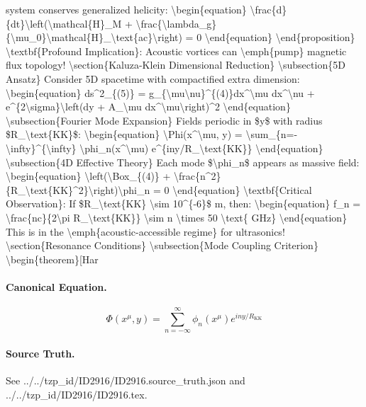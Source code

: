 system conserves generalized helicity: \textbackslash{}begin\{equation\} \textbackslash{}frac\{d\}\{dt\}\textbackslash{}left(\textbackslash{}mathcal\{H\}\_M + \textbackslash{}frac\{\textbackslash{}lambda\_g\}\{\textbackslash{}mu\_0\}\textbackslash{}mathcal\{H\}\_\textbackslash{}text\{ac\}\textbackslash{}right) = 0 \textbackslash{}end\{equation\} \textbackslash{}end\{proposition\} \textbackslash{}textbf\{Profound Implication\}: Acoustic vortices can \textbackslash{}emph\{pump\} magnetic flux topology! \textbackslash{}section\{Kaluza-Klein Dimensional Reduction\} \textbackslash{}subsection\{5D Ansatz\} Consider 5D spacetime with compactified extra dimension: \textbackslash{}begin\{equation\} ds\textasciicircum{}2\_\{(5)\} = g\_\{\textbackslash{}mu\textbackslash{}nu\}\textasciicircum{}\{(4)\}dx\textasciicircum{}\textbackslash{}mu dx\textasciicircum{}\textbackslash{}nu + e\textasciicircum{}\{2\textbackslash{}sigma\}\textbackslash{}left(dy + A\_\textbackslash{}mu dx\textasciicircum{}\textbackslash{}mu\textbackslash{}right)\textasciicircum{}2 \textbackslash{}end\{equation\} \textbackslash{}subsection\{Fourier Mode Expansion\} Fields periodic in \$y\$ with radius \$R\_\textbackslash{}text\{KK\}\$: \textbackslash{}begin\{equation\} \textbackslash{}Phi(x\textasciicircum{}\textbackslash{}mu, y) = \textbackslash{}sum\_\{n=-\textbackslash{}infty\}\textasciicircum{}\{\textbackslash{}infty\} \textbackslash{}phi\_n(x\textasciicircum{}\textbackslash{}mu) e\textasciicircum{}\{iny/R\_\textbackslash{}text\{KK\}\} \textbackslash{}end\{equation\} \textbackslash{}subsection\{4D Effective Theory\} Each mode \$\textbackslash{}phi\_n\$ appears as massive field: \textbackslash{}begin\{equation\} \textbackslash{}left(\textbackslash{}Box\_\{(4)\} + \textbackslash{}frac\{n\textasciicircum{}2\}\{R\_\textbackslash{}text\{KK\}\textasciicircum{}2\}\textbackslash{}right)\textbackslash{}phi\_n = 0 \textbackslash{}end\{equation\} \textbackslash{}textbf\{Critical Observation\}: If \$R\_\textbackslash{}text\{KK\} \textbackslash{}sim 10\textasciicircum{}\{-6\}\$ m, then: \textbackslash{}begin\{equation\} f\_n = \textbackslash{}frac\{nc\}\{2\textbackslash{}pi R\_\textbackslash{}text\{KK\}\} \textbackslash{}sim n \textbackslash{}times 50 \textbackslash{}text\{ GHz\} \textbackslash{}end\{equation\} This is in the \textbackslash{}emph\{acoustic-accessible regime\} for ultrasonics! \textbackslash{}section\{Resonance Conditions\} \textbackslash{}subsection\{Mode Coupling Criterion\} \textbackslash{}begin\{theorem\}[Har

\paragraph{Canonical Equation.}
\[
\begin{equation} \Phi(x^\mu, y) = \sum_{n=-\infty}^{\infty} \phi_n(x^\mu) e^{iny/R_\text{KK}} \end{equation}
\]

\paragraph{Source Truth.}
See ../../tzp\_id/ID2916/ID2916.source\_truth.json and ../../tzp\_id/ID2916/ID2916.tex.
